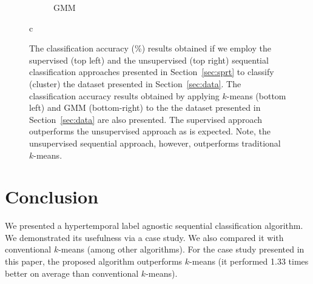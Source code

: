 \documentclass{article}
\begin{document}
\begin{figure}[h]
\begin{subfigure}[b]{0.5\linewidth}
    \caption{GMM} 
    \label{fig7:d} 
  \end{subfigure} 
  \caption{c}
  \label{fig7} 
  \caption{The classification accuracy (\%) results obtained if we employ the supervised (top left) and the unsupervised (top right) sequential classification approaches presented in Section~\ref{sec:sprt} to classify (cluster) the dataset presented in Section~\ref{sec:data}. The classification accuracy results obtained by applying $k$-means (bottom left) and GMM (bottom-right) to the the dataset presented in Section~\ref{sec:data} are also presented. The supervised approach outperforms the unsupervised approach as is expected. Note, the unsupervised sequential approach, however, outperforms traditional $k$-means.}
  \label{fig:results}
\end{figure}

\section{Conclusion}
\label{sec:ref}
We presented a hypertemporal label agnostic sequential classification algorithm. We  demonstrated its usefulness via a case study. We also compared it with conventional $k$-means (among other algorithms). For the case study presented in this paper, the proposed algorithm outperforms $k$-means (it performed 1.33 times better on average than conventional $k$-means). 

\end{document}
